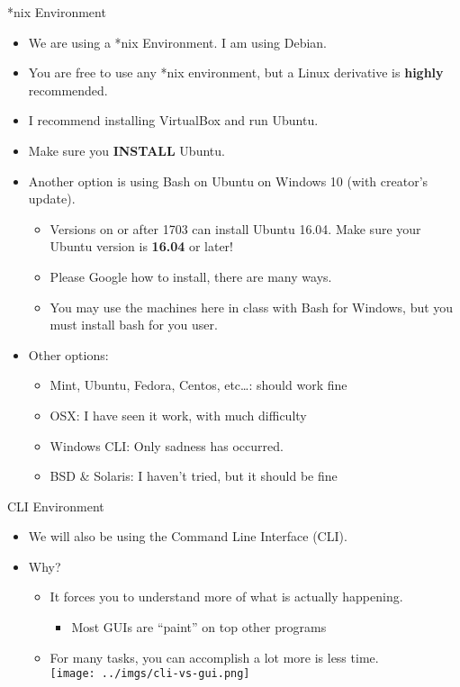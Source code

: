 \documentclass{beamer}
\begin{document}
\begin{frame}{*nix Environment}
\begin{itemize}
\item We are using a *nix Environment.  I am using Debian.
\item You are free to use any *nix environment, but a Linux derivative is \textbf{highly} recommended.
\item I recommend installing VirtualBox and run Ubuntu.
\item Make sure you \textbf{INSTALL} Ubuntu.
\item Another option is using Bash on Ubuntu on Windows 10 (with creator's update).
\begin{itemize}
\item Versions on or after 1703 can install Ubuntu 16.04. Make sure your Ubuntu version is \textbf{16.04} or later!
\item Please Google how to install, there are many ways.
\item You may use the machines here in class with Bash for Windows, but you must install bash for you user.
\end{itemize}
\item Other options:
\begin{itemize}
\item Mint, Ubuntu, Fedora, Centos, etc\ldots: should work fine
\item OSX: I have seen it work, with much difficulty
\item Windows CLI: Only sadness has occurred.
\item BSD \& Solaris: I haven't tried, but it should be fine
\end{itemize}
\end{itemize}
\end{frame}

\begin{frame}{CLI Environment}
\begin{itemize}
\item We will also be using the Command Line Interface (CLI).
\item Why?
\begin{itemize}
\item It forces you to understand more of what is actually happening.
\begin{itemize}
\item Most GUIs are ``paint'' on top other programs
\end{itemize}
\item For many tasks, you can accomplish a lot more is less time. \\
\texttt{[image: ../imgs/cli-vs-gui.png]}
\end{itemize}
\end{itemize}
\end{frame}
\end{document}
